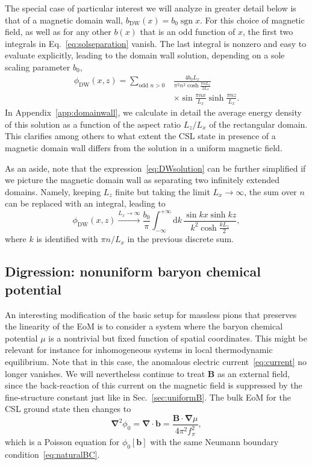 \documentclass[pdflatex,iicol,sn-mathphys-num]{sn-jnl}
\let\m=\mu
\let\p=\phi
\newcommand{\dd}{\text{d}}%
\newcommand{\vek}[1]{\bm{#1}}%
\newcommand{\grad}{\vek\nabla}%
\newcommand{\divg}{\grad\cdot}%
\newcommand{\bmag}{b}%
\begin{document}
The special case of particular interest we will analyze in greater detail below is that of a magnetic domain wall, $\bmag_\text{DW}(x)=\bmag_0\operatorname{sgn}x$. For this choice of magnetic field, as well as for any other $\bmag(x)$ that is an odd function of $x$, the first two integrals in Eq.~\eqref{eq:solseparation} vanish. The last integral is nonzero and easy to evaluate explicitly, leading to the domain wall solution, depending on a sole scaling parameter $\bmag_0$,
\begin{equation}
\begin{split}
\p_{\text{DW}}(x,z)=\sum_{\text{odd }n>0}&\frac{4\bmag_0L_x}{\pi^2n^2\cosh\frac{\pi nL_z}{2L_x}}\\
&\times\sin\frac{\pi nx}{L_x}\sinh\frac{\pi nz}{L_x}.
\end{split}
\label{eq:DWsolution}
\end{equation}
In Appendix~\ref{app:domainwall}, we calculate in detail the average energy density of this solution as a function of the aspect ratio $L_z/L_x$ of the rectangular domain. This clarifies among others to what extent the CSL state in presence of a magnetic domain wall differs from the solution in a uniform magnetic field.

As an aside, note that the expression~\eqref{eq:DWsolution} can be further simplified if we picture the magnetic domain wall as separating two infinitely extended domains. Namely, keeping $L_z$ finite but taking the limit $L_x\to\infty$, the sum over $n$ can be replaced with an integral, leading to
\begin{equation}
\p_{\text{DW}}(x,z)\xrightarrow{L_x\to\infty}\frac{\bmag_0}{\pi}\int_{-\infty}^{+\infty}\dd k\,\frac{\sin kx\sinh kz}{k^2\cosh\frac{kL_z}2},
\end{equation}
where $k$ is identified with $\pi n/L_x$ in the previous discrete sum.


\subsection{Digression: nonuniform baryon chemical potential}
\label{subsec:nonuniformBzeroMdigression}

An interesting modification of the basic setup for massless pions that preserves the linearity of the EoM is to consider a system where the baryon chemical potential $\m$ is a nontrivial but fixed function of spatial coordinates. This might be relevant for instance for inhomogeneous systems in local thermodynamic equilibrium. Note that in this case, the anomalous electric current~\eqref{eq:current} no longer vanishes. We will nevertheless continue to treat $\vek B$ as an external field, since the back-reaction of this current on the magnetic field is suppressed by the fine-structure constant just like in Sec.~\ref{sec:uniformB}. The bulk EoM for the CSL ground state then changes to
\begin{equation}
\grad^2\p_0=\divg\vek\bmag=\frac{\vek B\cdot\grad\m}{4\pi^2f_\pi^2},
\end{equation}
which is a Poisson equation for $\p_0[\vek\bmag]$ with the same Neumann boundary condition~\eqref{eq:naturalBC}.
\end{document}
